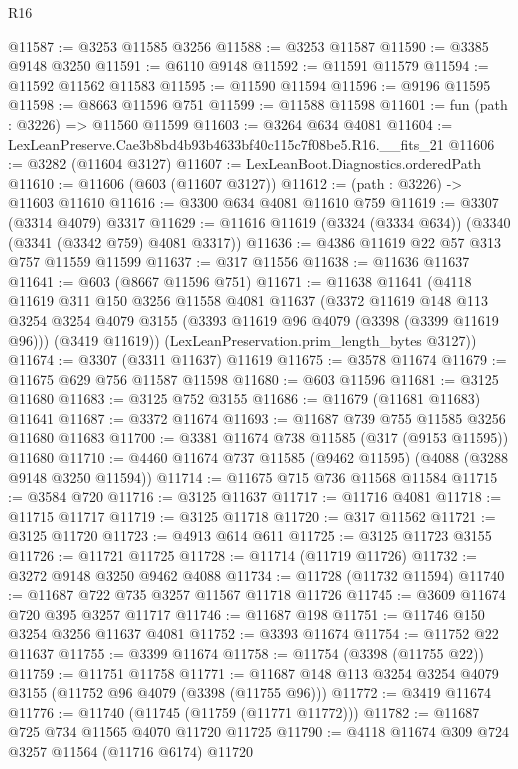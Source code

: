 \begin{lexlean}{R16}
\begin{coremodule}
@11587 := @3253 @11585 @3256
@11588 := @3253 @11587
@11590 := @3385 @9148 @3250
@11591 := @6110 @9148
@11592 := @11591 @11579
@11594 := @11592 @11562 @11583
@11595 := @11590 @11594
@11596 := @9196 @11595
@11598 := @8663 @11596 @751
@11599 := @11588 @11598
@11601 := fun (path : @3226) => @11560 @11599
@11603 := @3264 @634 @4081
@11604 := LexLeanPreserve.Cae3b8bd4b93b4633bf40c115c7f08be5.R16.__fits_21
@11606 := @3282 (@11604 @3127)
@11607 := LexLeanBoot.Diagnostics.orderedPath
@11610 := @11606 (@603 (@11607 @3127))
@11612 := (path : @3226) -> @11603 @11610
@11616 := @3300 @634 @4081 @11610 @759
@11619 := @3307 (@3314 @4079) @3317
@11629 := @11616 @11619 (@3324 (@3334 @634)) (@3340 (@3341 (@3342 @759) @4081 @3317))
@11636 := @4386 @11619 @22 @57 @313 @757 @11559 @11599
@11637 := @317 @11556
@11638 := @11636 @11637
@11641 := @603 (@8667 @11596 @751)
@11671 := @11638
    @11641
    (@4118
      @11619
      @311
      @150
      @3256
      @11558
      @4081
      @11637
      (@3372
        @11619
        @148
        @113
        @3254
        @3254
        @4079
        @3155
        (@3393 @11619 @96 @4079 (@3398 (@3399 @11619 @96)))
        (@3419 @11619))
      (LexLeanPreservation.prim_length_bytes @3127))
@11674 := @3307 (@3311 @11637) @11619
@11675 := @3578 @11674
@11679 := @11675 @629 @756 @11587 @11598
@11680 := @603 @11596
@11681 := @3125 @11680
@11683 := @3125 @752 @3155
@11686 := @11679 (@11681 @11683) @11641
@11687 := @3372 @11674
@11693 := @11687 @739 @755 @11585 @3256 @11680 @11683
@11700 := @3381 @11674 @738 @11585 (@317 (@9153 @11595)) @11680
@11710 := @4460 @11674 @737 @11585 (@9462 @11595) (@4088 (@3288 @9148 @3250 @11594))
@11714 := @11675 @715 @736 @11568 @11584
@11715 := @3584 @720
@11716 := @3125 @11637
@11717 := @11716 @4081
@11718 := @11715 @11717
@11719 := @3125 @11718
@11720 := @317 @11562
@11721 := @3125 @11720
@11723 := @4913 @614 @611
@11725 := @3125 @11723 @3155
@11726 := @11721 @11725
@11728 := @11714 (@11719 @11726)
@11732 := @3272 @9148 @3250 @9462 @4088
@11734 := @11728 (@11732 @11594)
@11740 := @11687 @722 @735 @3257 @11567 @11718 @11726
@11745 := @3609 @11674 @720 @395 @3257 @11717
@11746 := @11687 @198
@11751 := @11746 @150 @3254 @3256 @11637 @4081
@11752 := @3393 @11674
@11754 := @11752 @22 @11637
@11755 := @3399 @11674
@11758 := @11754 (@3398 (@11755 @22))
@11759 := @11751 @11758
@11771 := @11687 @148 @113 @3254 @3254 @4079 @3155 (@11752 @96 @4079 (@3398 (@11755 @96)))
@11772 := @3419 @11674
@11776 := @11740 (@11745 (@11759 (@11771 @11772)))
@11782 := @11687 @725 @734 @11565 @4070 @11720 @11725
@11790 := @4118 @11674 @309 @724 @3257 @11564 (@11716 @6174) @11720

\end{coremodule}
\end{lexlean}
